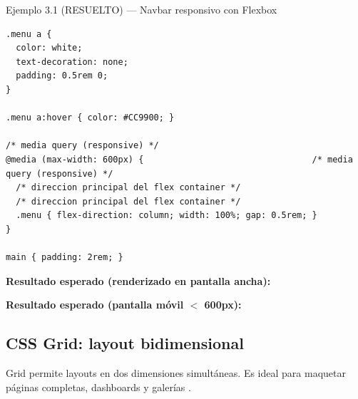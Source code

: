 \documentclass[11pt,a4paper,openany]{book}
\begin{document}
\begin{cajaejemplo}{Ejemplo 3.1 (RESUELTO) --- Navbar responsivo con Flexbox}
\begin{lstlisting}[style=css,caption={navbar.css},label=lst:3.5]
.menu a {
  color: white;
  text-decoration: none;
  padding: 0.5rem 0;
}

.menu a:hover { color: #CC9900; }

/* media query (responsive) */
@media (max-width: 600px) {                                 /* media query (responsive) */
  /* direccion principal del flex container */
  /* direccion principal del flex container */
  .menu { flex-direction: column; width: 100%; gap: 0.5rem; }
}

main { padding: 2rem; }
\end{lstlisting}

\textbf{Resultado esperado (renderizado en pantalla ancha):}


\textbf{Resultado esperado (pantalla móvil $<$ 600px):}

\end{cajaejemplo}

\subsection{CSS Grid: layout bidimensional}

Grid permite layouts en dos dimensiones simultáneas. Es ideal para
maquetar páginas completas, dashboards y galerías
\cite{macdonald2018css}.
\end{document}
